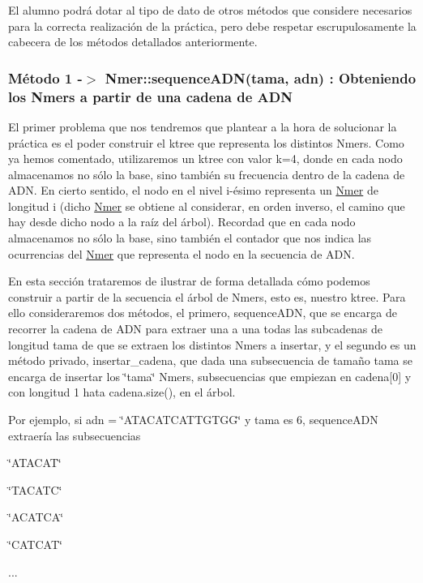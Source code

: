 El alumno podrá dotar al tipo de dato de otros métodos que considere necesarios para la correcta realización de la práctica, pero debe respetar escrupulosamente la cabecera de los métodos detallados anteriormente.\hypertarget{index_crear}{}\subsubsection{Método 1 -\/$>$  Nmer\+::sequence\+A\+D\+N(tama, adn) \+: Obteniendo los Nmers a partir de una cadena de A\+DN}\label{index_crear}
El primer problema que nos tendremos que plantear a la hora de solucionar la práctica es el poder construir el ktree que representa los distintos Nmers. Como ya hemos comentado, utilizaremos un ktree con valor k=4, donde en cada nodo almacenamos no sólo la base, sino también su frecuencia dentro de la cadena de A\+DN. En cierto sentido, el nodo en el nivel i-\/ésimo representa un \hyperlink{classNmer}{Nmer} de longitud i (dicho \hyperlink{classNmer}{Nmer} se obtiene al considerar, en orden inverso, el camino que hay desde dicho nodo a la raíz del árbol). Recordad que en cada nodo almacenamos no sólo la base, sino también el contador que nos indica las ocurrencias del \hyperlink{classNmer}{Nmer} que representa el nodo en la secuencia de A\+DN.

En esta sección trataremos de ilustrar de forma detallada cómo podemos construir a partir de la secuencia el árbol de Nmers, esto es, nuestro ktree. Para ello consideraremos dos métodos, el primero, sequence\+A\+DN, que se encarga de recorrer la cadena de A\+DN para extraer una a una todas las subcadenas de longitud tama de que se extraen los distintos Nmers a insertar, y el segundo es un método privado, insertar\+\_\+cadena, que dada una subsecuencia de tamaño tama se encarga de insertar los \char`\"{}tama\char`\"{} Nmers, subsecuencias que empiezan en cadena\mbox{[}0\mbox{]} y con longitud 1 hata cadena.\+size(), en el árbol.

Por ejemplo, si adn = \char`\"{}\+A\+T\+A\+C\+A\+T\+C\+A\+T\+T\+G\+T\+G\+G\char`\"{} y tama es 6, sequence\+A\+DN extraería las subsecuencias


\begin{DoxyItemize}
\item \char`\"{}\+A\+T\+A\+C\+A\+T\char`\"{}
\item \char`\"{}\+T\+A\+C\+A\+T\+C\char`\"{}
\item \char`\"{}\+A\+C\+A\+T\+C\+A\char`\"{}
\item \char`\"{}\+C\+A\+T\+C\+A\+T\char`\"{}
\item ...
\end{DoxyItemize}

